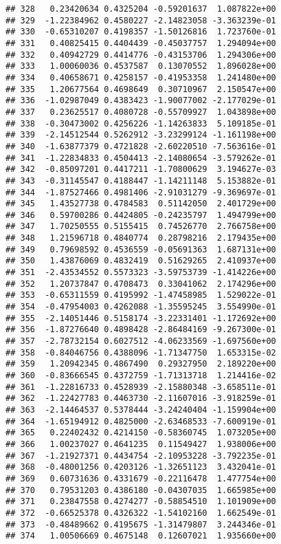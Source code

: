 \documentclass[
]{article}
\begin{document}
\begin{verbatim}
## 328   0.23420634 0.4325204 -0.59201637  1.087822e+00
## 329  -1.22384962 0.4580227 -2.14823058 -3.363239e-01
## 330  -0.65310207 0.4198357 -1.50126816  1.723760e-01
## 331   0.40825415 0.4404439 -0.45037757  1.294094e+00
## 332   0.40942729 0.4414776 -0.43153706  1.294306e+00
## 333   1.00060036 0.4537587  0.13070552  1.896028e+00
## 334   0.40658671 0.4258157 -0.41953358  1.241480e+00
## 335   1.20677564 0.4698649  0.30710967  2.150547e+00
## 336  -1.02987049 0.4383423 -1.90077002 -2.177029e-01
## 337   0.23625517 0.4080728 -0.55709927  1.043898e+00
## 338  -0.30473002 0.4256226 -1.14263833  5.109185e-01
## 339  -2.14512544 0.5262912 -3.23299124 -1.161198e+00
## 340  -1.63877379 0.4721828 -2.60220510 -7.563616e-01
## 341  -1.22834833 0.4504413 -2.14080654 -3.579262e-01
## 342  -0.85097201 0.4417211 -1.70800629  3.194627e-03
## 343  -0.31145547 0.4188447 -1.14211148  5.153882e-01
## 344  -1.87527466 0.4981406 -2.91031279 -9.369697e-01
## 345   1.43527738 0.4784583  0.51142050  2.401729e+00
## 346   0.59700286 0.4424805 -0.24235797  1.494799e+00
## 347   1.70250555 0.5155415  0.74526770  2.766758e+00
## 348   1.21596718 0.4840774  0.28798216  2.179435e+00
## 349   0.79698592 0.4536559 -0.05691363  1.687131e+00
## 350   1.43876069 0.4832419  0.51629265  2.410937e+00
## 351  -2.43534552 0.5573323 -3.59753739 -1.414226e+00
## 352   1.20737847 0.4708473  0.33041062  2.174296e+00
## 353  -0.65311559 0.4195992 -1.47458985  1.529022e-01
## 354  -0.47954003 0.4262088 -1.35595245  3.554990e-01
## 355  -2.14051446 0.5158174 -3.22331401 -1.172692e+00
## 356  -1.87276640 0.4898428 -2.86484169 -9.267300e-01
## 357  -2.78732154 0.6027512 -4.06233569 -1.697560e+00
## 358  -0.84046756 0.4388096 -1.71347750  1.653315e-02
## 359   1.20942345 0.4867490  0.29327950  2.189220e+00
## 360  -0.83666545 0.4372759 -1.71313718  1.214416e-02
## 361  -1.22816733 0.4528939 -2.15880348 -3.658511e-01
## 362  -1.22427783 0.4463730 -2.11607016 -3.918259e-01
## 363  -2.14464537 0.5378444 -3.24240404 -1.159904e+00
## 364  -1.65194912 0.4825000 -2.63468533 -7.600919e-01
## 365   0.22402432 0.4214150 -0.58360745  1.073205e+00
## 366   1.00237027 0.4641235  0.11549427  1.938006e+00
## 367  -1.21927371 0.4434754 -2.10953228 -3.792235e-01
## 368  -0.48001256 0.4203126 -1.32651123  3.432041e-01
## 369   0.60731636 0.4331679 -0.22116478  1.477754e+00
## 370   0.79531203 0.4386180 -0.04307035  1.665985e+00
## 371   0.23847558 0.4274277 -0.58854510  1.101909e+00
## 372  -0.66525378 0.4326322 -1.54102160  1.662549e-01
## 373  -0.48489662 0.4195675 -1.31479807  3.244346e-01
## 374   1.00506669 0.4675148  0.12607021  1.935660e+00

\end{verbatim}
\end{document}
